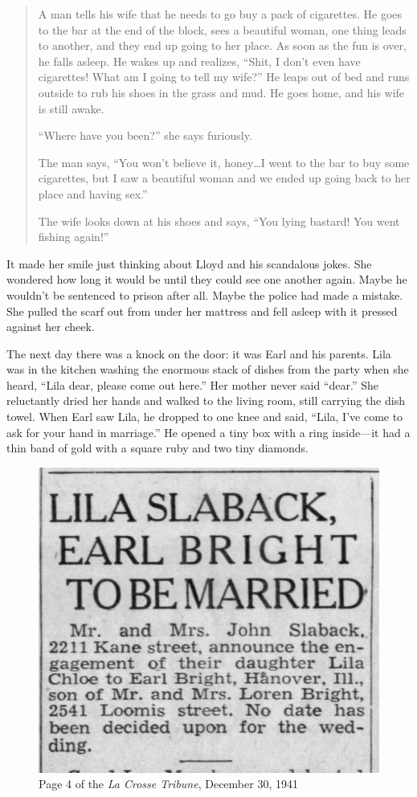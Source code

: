 \documentclass[
  letterpaper,
]{book}
\begin{document}
\begin{quote}
A man tells his wife that he needs to go buy a pack of cigarettes. He
goes to the bar at the end of the block, sees a beautiful woman, one
thing leads to another, and they end up going to her place. As soon as
the fun is over, he falls asleep. He wakes up and realizes, ``Shit, I
don't even have cigarettes! What am I going to tell my wife?'' He leaps
out of bed and runs outside to rub his shoes in the grass and mud. He
goes home, and his wife is still awake.

``Where have you been?'' she says furiously.

The man says, ``You won't believe it, honey\ldots I went to the bar to
buy some cigarettes, but I saw a beautiful woman and we ended up going
back to her place and having sex.''

The wife looks down at his shoes and says, ``You lying bastard! You went
fishing again!''
\end{quote}

It made her smile just thinking about Lloyd and his scandalous jokes.
She wondered how long it would be until they could see one another
again. Maybe he wouldn't be sentenced to prison after all. Maybe the
police had made a mistake. She pulled the scarf out from under her
mattress and fell asleep with it pressed against her cheek.

The next day there was a knock on the door: it was Earl and his parents.
Lila was in the kitchen washing the enormous stack of dishes from the
party when she heard, ``Lila dear, please come out here.'' Her mother
never said ``dear.'' She reluctantly dried her hands and walked to the
living room, still carrying the dish towel. When Earl saw Lila, he
dropped to one knee and said, ``Lila, I've come to ask for your hand in
marriage.'' He opened a tiny box with a ring inside---it had a thin band
of gold with a square ruby and two tiny diamonds.

\begin{figure}[H]

{\centering \includegraphics[width=0.55\linewidth,height=\textheight,keepaspectratio]{images/Akou13.jpg}

}

\caption{Page 4 of the \emph{La Crosse Tribune}, December 30, 1941}

\end{figure}%
\end{document}
